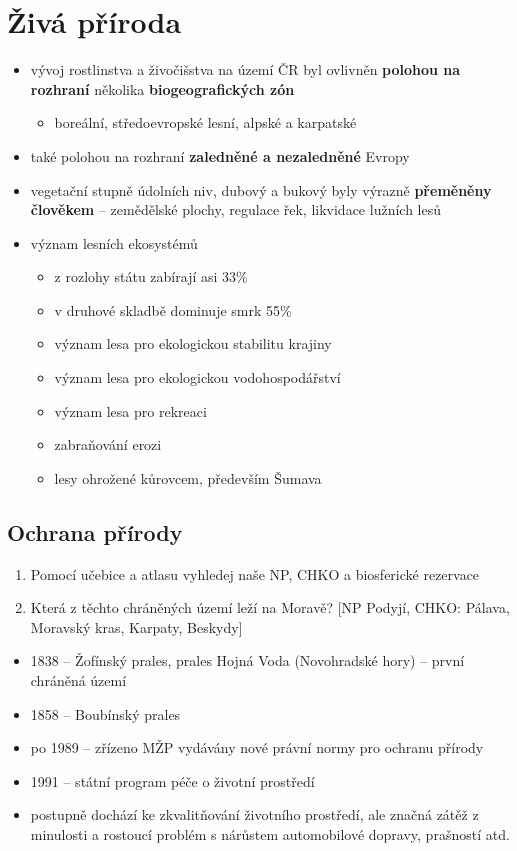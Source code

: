 \section{Živá příroda}
\begin{itemize}
\item vývoj rostlinstva a živočišstva na území ČR byl ovlivněn \textbf{polohou na rozhraní} několika \textbf{biogeografických zón}
	\begin{itemize}
	\item boreální, středoevropské lesní, alpské a karpatské
	\end{itemize}
\item také polohou na rozhraní \textbf{zaledněné a nezaledněné} Evropy
\item vegetační stupně údolních niv, dubový a bukový byly výrazně \textbf{přeměněny člověkem} -- zemědělské plochy, regulace řek, likvidace lužních lesů
\item význam lesních ekosystémů
	\begin{itemize}
	\item z rozlohy státu zabírají asi 33\%
	\item v druhové skladbě dominuje smrk 55\%
	\item význam lesa pro ekologickou stabilitu krajiny
	\item význam lesa pro ekologickou vodohospodářství
	\item význam lesa pro rekreaci
	\item zabraňování erozi
	\item lesy ohrožené kůrovcem, především Šumava	
	\end{itemize}
\end{itemize}


\subsection{Ochrana přírody}
\begin{enumerate}
\item Pomocí učebice a atlasu vyhledej naše NP, CHKO a biosferické rezervace
\item Která z těchto chráněných území leží na Moravě? [NP Podyjí, CHKO: Pálava, Moravský kras, Karpaty, Beskydy] 
\end{enumerate}


\begin{itemize}
\item 1838 -- Žofínský prales, prales Hojná Voda (Novohradské hory) -- první chráněná území
\item 1858 -- Boubínský prales
\item po 1989 -- zřízeno MŽP \ra vydávány nové právní normy pro ochranu přírody
\item 1991 -- státní program péče o životní prostředí
\item postupně dochází ke zkvalitňování životního prostředí, ale značná zátěž z minulosti a rostoucí problém s nárůstem automobilové dopravy, prašností atd.
\end{itemize}

